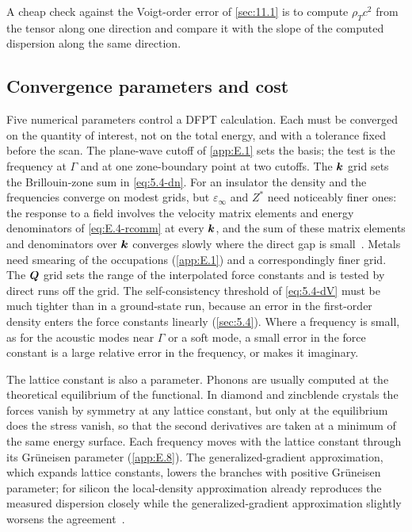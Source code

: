 A cheap check against the Voigt-order error of \cref{sec:11.1} is to compute $\rho_Tc^2$ from the tensor along one direction and compare it with the slope of the computed dispersion along the same direction.

\subsection{Convergence parameters and cost}

Five numerical parameters control a DFPT calculation. Each must be converged on the quantity of interest, not on the total energy, and with a tolerance fixed before the scan. The plane-wave cutoff of \cref{app:E.1} sets the basis; the test is the frequency at $\Gamma$ and at one zone-boundary point at two cutoffs. The $\bm{k}$ grid sets the Brillouin-zone sum in \cref{eq:5.4-dn}. For an insulator the density and the frequencies converge on modest grids, but $\varepsilon_\infty$ and $Z^*$ need noticeably finer ones: the response to a field involves the velocity matrix elements and energy denominators of \cref{eq:E.4-rcomm} at every $\bm{k}$, and the sum of these matrix elements and denominators over $\bm{k}$ converges slowly where the direct gap is small~\cite[Sect.~II.C.2]{baroni2001phonons}. Metals need smearing of the occupations (\cref{app:E.1}) and a correspondingly finer grid. The $\bm{Q}$ grid sets the range of the interpolated force constants and is tested by direct runs off the grid. The self-consistency threshold of \cref{eq:5.4-dV} must be much tighter than in a ground-state run, because an error in the first-order density enters the force constants linearly (\cref{sec:5.4}). Where a frequency is small, as for the acoustic modes near $\Gamma$ or a soft mode, a small error in the force constant is a large relative error in the frequency, or makes it imaginary.

The lattice constant is also a parameter. Phonons are usually computed at the theoretical equilibrium of the functional. In diamond and zincblende crystals the forces vanish by symmetry at any lattice constant, but only at the equilibrium does the stress vanish, so that the second derivatives are taken at a minimum of the same energy surface. Each frequency moves with the lattice constant through its Gr\"uneisen parameter (\cref{app:E.8}). The generalized-gradient approximation, which expands lattice constants, lowers the branches with positive Gr\"uneisen parameter; for silicon the local-density approximation already reproduces the measured dispersion closely while the generalized-gradient approximation slightly worsens the agreement~\cite[Sect.~V.A]{baroni2001phonons}.

